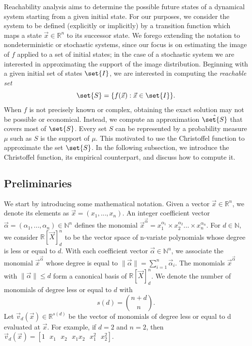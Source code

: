 \documentclass[pmlr]{jmlr}%
\begin{document}
Reachability analysis aims to determine the possible future states of a dynamical system starting from a given initial state. For our purposes, we consider the system to be defined (explicitly or implicitly) by a transition function 
which maps a state $\Vec{x} \in \mathbb{R}^{n}$ to its successor state.
We forego extending the notation to nondeterministic or stochastic systems, since our focus is on estimating the image of $f$ applied to a set of initial states; in the case of a stochastic system we are interested in approximating the support of the image distribution.
%
Beginning with a given initial set of states $\set{I}$, we are interested in computing the \emph{reachable set}
$$\set{S}= \{ f(\Vec{x}) : \Vec{x} \in \set{I} \}.$$
 When $f$ is not precisely known or complex, obtaining the exact solution may not be possible or economical. Instead, we compute an approximation $\hat{\set{S}}$ that covers most of $\set{S}$. 
 Every set $S$ can be represented by a probability measure $\mu$ such as $S$ is the support of $\mu$. This motivated \cite{devonport} to use the Christoffel function to approximate the set $\set{S}$. 
 In the following subsection, we introduce the Christoffel function, its empirical counterpart, and discuss how to compute it.

\subsection{Preliminaries}
%
We start by introducing some mathematical notation. Given a vector $\Vec{x} \in \mathbb{R}^n$, we denote its elements as  
 $\Vec{x} = ({x}_1,..., {x}_n) $. An integer coefficient vector $\Vec{\alpha} = ({\alpha}_1,...,{\alpha}_n ) \in \mathbb{N}^n$ defines the monomial $\Vec{x}^{\Vec{\alpha}} = {x}_1^{{\alpha}_1}\times {x}_2^{{\alpha}_2}...\times {x}_n^{{\alpha}_n} $.
For $d \in \mathbb{N}$, we consider $\mathbb{R}[\Vec{X}]_d^n$ to be the vector space of n-variate polynomials whose degree is less or equal to $d$. 
With each coefficient vector $\Vec{\alpha} \in \mathbb{N}^n$, we associate the monomial $\Vec{x}^{\vec{\alpha}}$ whose degree is equal to $\| \Vec{\alpha} \|=\sum_{i=1}^{n}\Vec{\alpha}_i$. 
The monomials $\Vec{x}^{\Vec{\alpha}}$ with $\| \Vec{\alpha} \| \leq d $ form a canonical basis of $\mathbb{R}[\Vec{X}]_d^n$. 
We denote the number of monomials of degree less or equal to $d$ with $$s(d) = \binom{n+d}{n}.$$ 
Let $\Vec{v}_d(\Vec{x}) \in \mathbb{R}^{s(d)}$ be the vector of monomials of degree less or equal to d evaluated at $\Vec{x}$. 
For example, if $d= 2$ and $n = 2$, then $\Vec{v}_{d}(\Vec{x}) = [ 1\text{ } x_1\text{ } x_2\text{ } x_{1}x_{2}\text{ } x_{1}^2 \text{ }x_{2}^2 ] $.
\end{document}
